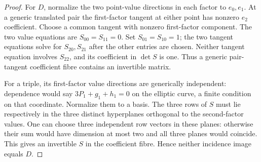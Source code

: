 \begin{proof}
For $D$, normalize the two point-value directions in each factor to
$e_0,e_1$. At a generic translated pair the first-factor tangent at
either point has nonzero $e_2$ coefficient. Choose a common tangent
with nonzero first-factor component. The two value equations are
$S_{00}=S_{11}=0$. Set $S_{01}=S_{10}=1$; the two tangent equations
solve for $S_{20},S_{21}$ after the other entries are chosen.
Neither tangent equation involves $S_{22}$, and its coefficient
in $\det S$ is one. Thus a generic pair-tangent coefficient fibre
contains an invertible matrix.

For a triple, its first-factor value directions are generically
independent: dependence would say $3P_1+g_1+h_1=0$ on the elliptic
curve, a finite condition on that coordinate. Normalize them to a
basis. The three rows of $S$ must lie respectively in the three
distinct hyperplanes orthogonal to the second-factor values.
One can choose three independent row vectors in these planes:
otherwise their sum would have dimension at most two and all
three planes would coincide. This gives an invertible $S$ in the
coefficient fibre. Hence neither incidence image equals $D$.
\end{proof}

